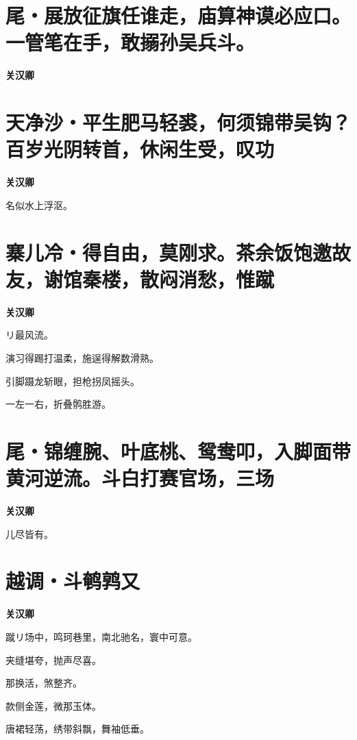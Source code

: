 \documentclass[12pt,a4paper]{ctexbook}
\begin{document}
\section{尾・展放征旗任谁走，庙算神谟必应口。一管笔在手，敢搦孙吴兵斗。}
\textbf{关汉卿}\par\vspace{0.5em}

\section{天净沙・平生肥马轻裘，何须锦带吴钩？百岁光阴转首，休闲生受，叹功}
\textbf{关汉卿}\par\vspace{0.5em}
名似水上浮沤。\par

\section{寨儿冷・得自由，莫刚求。茶余饭饱邀故友，谢馆秦楼，散闷消愁，惟蹴}
\textbf{关汉卿}\par\vspace{0.5em}
リ最风流。\par
演习得踢打温柔，施逞得解数滑熟。\par
引脚蹑龙斩眼，担枪拐凤摇头。\par
一左一右，折叠鹘胜游。\par

\section{尾・锦缠腕、叶底桃、鸳鸯叩，入脚面带黄河逆流。斗白打赛官场，三场}
\textbf{关汉卿}\par\vspace{0.5em}
儿尽皆有。\par

\section{越调・斗鹌鹑又}
\textbf{关汉卿}\par\vspace{0.5em}
蹴リ场中，鸣珂巷里，南北驰名，寰中可意。\par
夹缝堪夸，抛声尽喜。\par
那换活，煞整齐。\par
款侧金莲，微那玉体。\par
唐裙轻荡，绣带斜飘，舞袖低垂。\par
\end{document}
